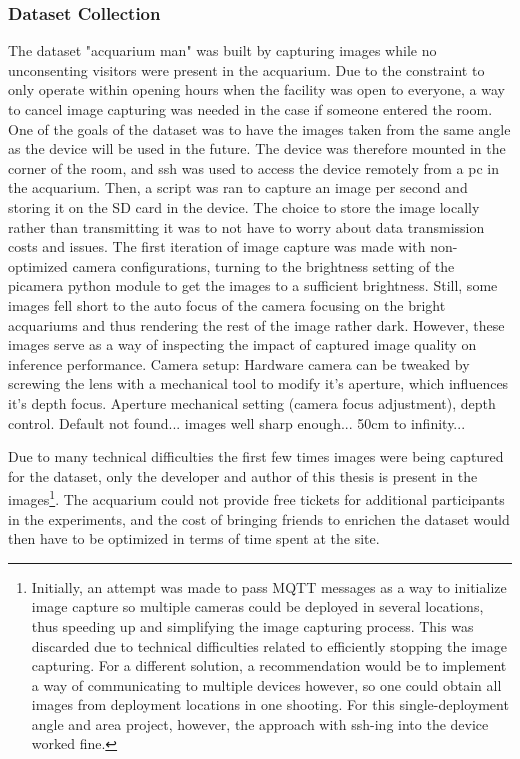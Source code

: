 \subsubsection{Dataset Collection}
The dataset "acquarium man" was built by capturing images while no unconsenting visitors were present in the acquarium. Due to the constraint to only operate within opening hours when the facility was open to everyone, a way to cancel image capturing was needed in the case if someone entered the room. One of the goals of the dataset was to have the images taken from the same angle as the device will be used in the future. The device was therefore mounted in the corner of the room, and ssh was used to access the device remotely from a pc in the acquarium. Then, a script was ran to capture an image per second and storing it on the SD card in the device. The choice to store the image locally rather than transmitting it was to not have to worry about data transmission costs and issues. The first iteration of image capture was made with non-optimized camera configurations, turning to the brightness setting of the picamera python module to get the images to a sufficient brightness. Still, some images fell short to the auto focus of the camera focusing on the bright acquariums and thus rendering the rest of the image rather dark. However, these images serve as a way of inspecting the impact of captured image quality on inference performance. 
Camera setup:
Hardware camera can be tweaked by screwing the lens with a mechanical tool to modify it's aperture, which influences it's depth focus. 
Aperture mechanical setting (camera focus adjustment), depth control. Default not found... images well sharp enough... 50cm to infinity...


Due to many technical difficulties the first few times images were being captured for the dataset, only the developer and author of this thesis is present in the images\footnote{Initially, an attempt was made to pass MQTT messages as a way to initialize image capture so multiple cameras could be deployed in several locations, thus speeding up and simplifying the image capturing process. This was discarded due to technical difficulties related to efficiently stopping the image capturing. For a different solution, a recommendation would be to implement a way of communicating to multiple devices however, so one could obtain all images from deployment locations in one shooting. For this single-deployment angle and area project, however, the approach with ssh-ing into the device worked fine.}. The acquarium could not provide free tickets for additional participants in the experiments, and the cost of bringing friends to enrichen the dataset would then have to be optimized in terms of time spent at the site.

